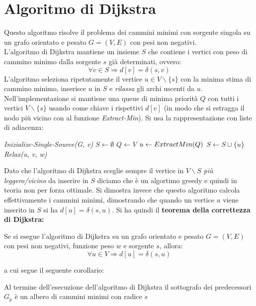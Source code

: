\documentclass[a4paper,12pt, oneside]{book}
\begin{document}
\section{Algoritmo di Dijkstra}
Questo algoritmo risolve il problema dei cammini minimi con sorgente
singola su un grafo orientato e pesato $G=(V,E)$ con pesi non
negativi.\\
L'algoritmo di Dijkstra mantiene un insieme $S$ che contiene i vertici
con peso di cammino minimo dalla sorgente $s$ già determinati, ovvero:
\[\forall v\in S \Longrightarrow d[v]=\delta(s,v)\]
L'algoritmo seleziona ripetutamente il vertice $u\in V\backslash\{s\}$
con la minima stima di cammino minimo, inserisce $u$ in $S$ e
\textit{rilassa} gli archi uscenti da $u$. Nell'implementazione si
mantiene una queue di minima priorità $Q$ con tutti i vertici $ V\backslash\{s\}$ usando
come chiave i rispettivi $d[v]$ (in modo che si estragga il nodo più
vicino con al funzione \textit{Extract-Min}). Si usa la
rappresentazione con liste di adiacenza:
\begin{algorithm}[H]
  \begin{algorithmic}
    \State \textit{Inizialize-Single-Source(G, v)}
    \State $S\gets \emptyset$
    \State $Q\gets V$
    \State $u\gets Extract\-Min(Q)$
    \State $S\gets S\cup \{u\}$
    \State \textit{Relax(u, v, w)}
    \EndFor
    \EndWhile
    \EndFunction
  \end{algorithmic}
\end{algorithm}
Dato che l'algoritmo di Dijkstra sceglie sempre il vertice in
$V\backslash S$ \textit{più leggero/vicino} da inserire in $S$ diciamo
che è un algortimo greedy e quindi in teoria non per forza
ottimale. Si dimostra invece che questo algoritmo calcola
effettivamente i cammini minimi, dimostrando che quando un vertice $u$
viene inserito in $S$ si ha $d[u]=\delta(s,u)$. Si ha quindi il
\textbf{teorema della correttezza di Dijkstra:}
\begin{teorema}
  Se si esegue l'algoritmo di Dijkstra su un grafo orientato e pesato
  $G=(V,E)$ con pesi non negativi, funzione peso $w$ e sorgente $s$,
  allora:
  \[\forall u \in V \Longrightarrow d[u]=\delta(s,u)\]
\end{teorema}
a cui segue il seguente corollario:
\begin{corollario}
  Al termine dell'esecuzione dell'algoritmo di Dijkstra il sottografo
  dei predecessori $G_p$ è un albero di cammini minimi con radice
  $s$ 
\end{corollario}
\end{document}
